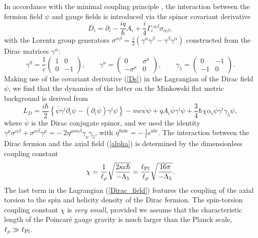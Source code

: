 \documentclass[12pt,prd,showkeys,amsmath,amssymb,nofootinbib]{revtex4-1}
\begin{document}
In accordance with the minimal coupling principle \cite{PhysRevD.90.124068}, the interaction between the fermion field $\psi$ and gauge fields is introduced via the spinor covariant derivative %
\begin{equation}\label{Ds}
D_i = \partial_i - {\frac {iq}{\hbar}}A_i + \frac{i}{4}\Gamma_i{}^{\alpha\beta}\sigma_{\alpha\beta},
\end{equation}
with the Lorentz group generators $\sigma^{\alpha\beta} =\frac{i}{2}(\gamma^{\alpha}\gamma^{\beta}-\gamma^{\beta}\gamma^{\alpha})$ constructed from the Dirac matrices $\gamma^\alpha$:
\begin{equation}
\gamma^0=\frac{1}{c}\begin{pmatrix} 1 & 0 \\ 0 & -1\end{pmatrix}, \qquad
\gamma^a=\begin{pmatrix} 0 & \sigma^a \\ -\sigma^a & 0 \end{pmatrix},\qquad  
\gamma_5=\begin{pmatrix} 0 & -1 \\ -1 & 0 \end{pmatrix}.
\end{equation}
Making use of the covariant derivative (\ref{Ds}) in the Lagrangian of the Dirac field $\psi$, we find that the dynamics of the latter on the Minkowski flat metric background is derived from
\begin{equation}\label{Dirac_field}
L_D = \frac{i\hbar}{2}\left\{\overline{\psi}\gamma^i\partial_i\psi -
(\partial_i\overline{\psi})\gamma^i\psi\right\} - mc\overline{\psi}\psi +
qA_i\overline{\psi}\gamma^i\psi + {\frac 34}\hbar\chi\alpha_i\overline{\psi}\gamma^i\gamma_5\psi,
\end{equation}
where $\overline{\psi}$ is the Dirac conjugate spinor, and we used the identity $\gamma^{\mu}\sigma^{\alpha\beta} + \sigma^{\alpha\beta}\gamma^{\mu} =-\,2\eta^{\mu\nu\alpha\beta}\gamma_{\nu}\gamma_{5}$, with $\eta^{0abc} = -\,{\frac{1}{c}}\epsilon^{abc}$. The interaction between the Dirac fermion and the axial field (\ref{alpha}) is determined by the dimensionless coupling constant
\begin{equation}\label{chi}
\chi = {\frac{1}{\ell_\rho}}\sqrt{\frac {2\kappa c\hbar}{-\Lambda_5}}
= {\frac{\ell_{\rm Pl}}{\ell_\rho}}\sqrt{\frac {16\pi}{-\Lambda_5}}.
\end{equation}
The last term in the Lagrangian (\ref{Dirac_field}) features the coupling of the axial torsion to the spin and helicity density of the Dirac fermion. The spin-torsion coupling constant $\chi$ is {\it very small}, provided we assume that the characteristic length of the Poincar\'e gauge gravity is much larger than the Planck scale, $\ell_\rho\gg\ell_{\rm Pl}$.
\end{document}
